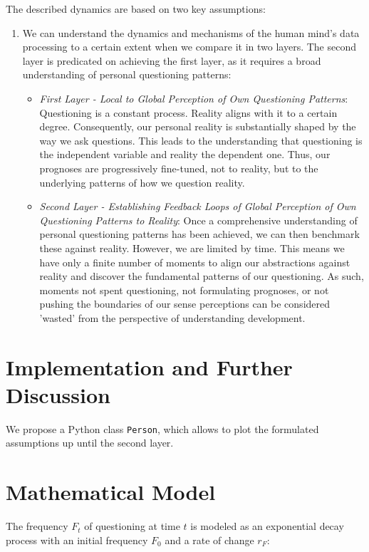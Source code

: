 \documentclass{article}
\begin{document}
The described dynamics are based on two key assumptions:
\begin{enumerate}
    \item We can understand the dynamics and mechanisms of the human mind's data processing to a certain extent when we compare it in two layers. The second layer is predicated on achieving the first layer, as it requires a broad understanding of personal questioning patterns:
        \begin{itemize}
        \item \textit{First Layer - Local to Global Perception of Own Questioning Patterns}: Questioning is a constant process. Reality aligns with it to a certain degree. Consequently, our personal reality is substantially shaped by the way we ask questions. This leads to the understanding that questioning is the independent variable and reality the dependent one. Thus, our prognoses are progressively fine-tuned, not to reality, but to the underlying patterns of how we question reality.
        \item \textit{Second Layer - Establishing Feedback Loops of Global Perception of Own Questioning Patterns to Reality}: Once a comprehensive understanding of personal questioning patterns has been achieved, we can then benchmark these against reality. However, we are limited by time. This means we have only a finite number of moments to align our abstractions against reality and discover the fundamental patterns of our questioning. As such, moments not spent questioning, not formulating prognoses, or not pushing the boundaries of our sense perceptions can be considered 'wasted' from the perspective of understanding development.
        \end{itemize}
\end{enumerate}
\label{sec:assumptions}


\section{Implementation and Further Discussion}

We propose a Python class \texttt{Person}, which allows to plot the formulated assumptions up until the second layer.

\section{Mathematical Model}

The frequency $F_t$ of questioning at time $t$ is modeled as an exponential decay process with an initial frequency $F_0$ and a rate of change $r_F$:
\end{document}

